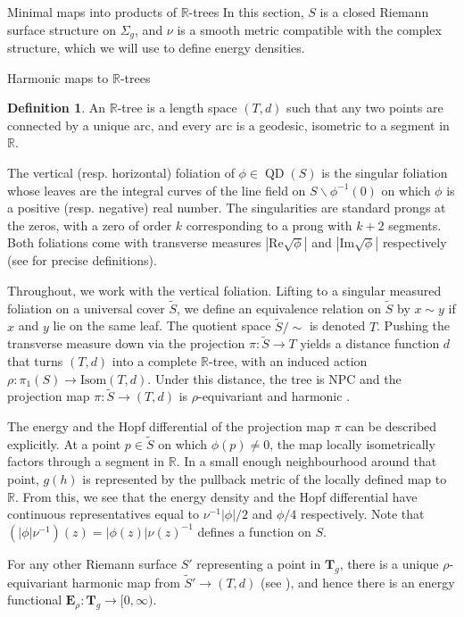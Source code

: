 \documentclass[10pt]{amsart}
\newcommand{\R}{\mathbb R}
\DeclareMathOperator{\QD}{\textrm{QD}}
\theoremstyle{definition}
\newtheorem{defn}[thm]{Definition}
\begin{document}
\begin{section}{Minimal maps into products of $\R$-trees}\label{3}
In this section, $S$ is a closed Riemann surface structure on $\Sigma_g$, and $\nu$ is a smooth metric compatible with the complex structure, which we will use to define energy densities.
\begin{subsection}{Harmonic maps to $\R$-trees}\label{3.1}
\begin{defn}
An $\mathbb{R}$-tree is a length space $(T,d)$ such that any two points are connected by a unique arc, and every arc is a geodesic, isometric to a segment in $\mathbb{R}$.
\end{defn} 
The vertical (resp. horizontal) foliation of $\phi\in \QD(S)$ is the singular foliation whose leaves are the integral curves of the line field on $S\backslash \phi^{-1}(0)$ on which $\phi$ is a positive (resp. negative) real number. The singularities are standard prongs at the zeros, with a zero of order $k$ corresponding to a prong with $k+2$ segments. Both foliations come with transverse measures  $|\textrm{Re}\sqrt{\phi}|$ and $|\textrm{Im}\sqrt{\phi}|$ respectively (see \cite[Expos{\'e} 5]{Thbook} for precise definitions).

Throughout, we work with the vertical foliation. Lifting to a singular measured foliation on a universal cover $\tilde{S}$, we define an equivalence relation on $\tilde{S}$ by $x\sim y$ if $x$ and $y$ lie on the same leaf. The quotient space $\tilde{S}/\sim$ is denoted $T$. Pushing the transverse measure down via the projection $\pi: \tilde{S}\to T$ yields a distance function $d$ that turns $(T,d)$ into a complete $\mathbb{R}$-tree, with an induced action $\rho:\pi_1(S)\to \textrm{Isom}(T,d).$ Under this distance, the tree is NPC and the projection map $\pi: \tilde{S}\to (T,d)$ is $\rho$-equivariant and harmonic \cite[Section 4]{Wf}.

The energy and the Hopf differential of the projection map $\pi$ can be described explicitly. At a point $p\in\tilde{S}$ on which $\phi(p)\neq 0$, the map locally isometrically factors through a segment in $\mathbb{R}$. In a small enough neighbourhood around that point, $g(h)$ is represented by the pullback metric of the locally defined map to $\mathbb{R}$. From this, we see that the energy density and the Hopf differential have continuous representatives equal to $\nu^{-1}|\phi|/2$ and $\phi/4$ respectively. Note that $(|\phi|\nu^{-1})(z)=|\phi(z)|\nu(z)^{-1}$ defines a function on $S$.

 For any other Riemann surface $S'$ representing a point in $\mathbf{T}_g$, there is a unique $\rho$-equivariant harmonic map from $\tilde{S}'\to (T,d)$ (see \cite{Wf}), and hence there is an energy functional $\mathbf{E}_\rho:\mathbf{T}_g\to [0,\infty).$ 


\end{subsection}
\end{section}
\end{document}
